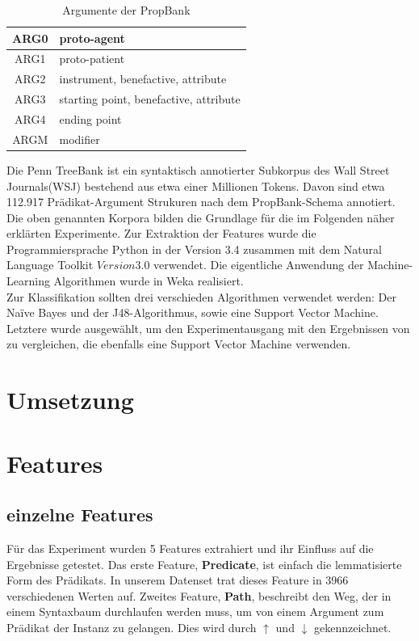 \documentclass[]{article}
\begin{document}
\begin{table}
	\centering
	\begin{tabular}{|c|l|}
	\hline 
	ARG0 & proto-agent \\ 
	\hline 
	ARG1 & proto-patient \\ 
	\hline 
	ARG2 & instrument, benefactive, attribute \\ 
	\hline 
	ARG3 & starting point, benefactive, attribute \\ 
	\hline 
	ARG4 & ending point \\ 
	\hline 
	ARGM & modifier \\ 
	\hline 
	\end{tabular}
	\caption{Argumente der PropBank}
	\end{table}
	Die Penn TreeBank \cite{Marcus93buildinga} ist ein syntaktisch annotierter Subkorpus des Wall Street Journals(WSJ) bestehend aus etwa einer Millionen Tokens. Davon sind etwa 112.917 Prädikat-Argument Strukuren nach dem PropBank-Schema annotiert. 
	\\
	Die oben genannten Korpora bilden die Grundlage für die im Folgenden näher erklärten Experimente.
	Zur Extraktion der Features wurde die Programmiersprache Python in der Version 3.4 zusammen mit dem Natural Language Toolkit \(Version 3.0\) verwendet. Die eigentliche Anwendung der Machine-Learning Algorithmen wurde in Weka \cite{Hall+FHPRW:2009} realisiert.
	\\
	Zur Klassifikation sollten drei verschieden Algorithmen verwendet werden:
	Der Naïve Bayes und der J48-Algorithmus, sowie eine Support
	Vector Machine. Letztere wurde ausgewählt, um den Experimentausgang mit den Ergebnissen von \cite{Pradhan05supportvector} zu vergleichen, die ebenfalls eine Support Vector Machine verwenden.
	
	
	



\section{Umsetzung} 

\section{Features}
\subsection{einzelne Features}
Für das Experiment wurden 5 Features extrahiert und ihr Einfluss auf die Ergebnisse getestet. Das erste Feature, \textbf{Predicate}, ist einfach die lemmatisierte Form des Prädikats. In unserem Datenset trat dieses Feature in 3966 verschiedenen Werten auf. Zweites Feature, \textbf{Path}, beschreibt den Weg, der in einem Syntaxbaum durchlaufen werden muss, um von einem Argument zum Prädikat der Instanz zu gelangen. Dies wird durch $\uparrow$ und $\downarrow$ gekennzeichnet.
\end{document}
